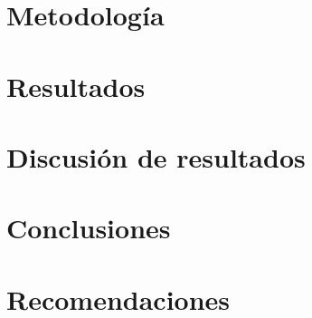 \documentclass[11pt, letterpaper, twoside, openright]{report}
\let\parpordefecto\undefined
\newcommand{\defaultparformat}[1]{
	{\setlength{\parskip}{2ex}
     }
}
\newcommand{\clearchapter}{\ifdefined\printver\cleardoublepage\else\clearpage\fi}
\begin{document}
\ifdefined\CAPmetodologia
	\newpage
	\chapter{Metodología}
	\ifdefined\parpordefecto
		\defaultparformat{j-metodologia}
	\else
		
	\fi
\fi

\ifdefined\CAPresultados
	\newpage
	\chapter{Resultados}
	\ifdefined\parpordefecto
		\defaultparformat{k-resultados}
	\else
		
	\fi
\fi

\ifdefined\CAPanalisisderesultado
	\newpage
	\chapter{Discusión de resultados}
	\ifdefined\parpordefecto
		\defaultparformat{l-discusion}
	\else
		
	\fi
\fi

\ifdefined\CAPconclusiones
	\newpage
	\chapter{Conclusiones}
	\ifdefined\parpordefecto
		\defaultparformat{m-conclusiones}
	\else
		
	\fi
\fi

\ifdefined\CAPrecomendaciones
	\newpage
	\chapter{Recomendaciones}
	\ifdefined\parpordefecto
		\defaultparformat{n-recomendaciones}
	\else
		
	\fi
\fi

\ifdefined\CAPbibliografia
	\newpage
	\clearchapter{}
	\chapter{\bibname}
	\printbibliography[heading=none]
\fi
\end{document}
